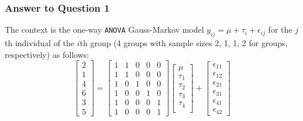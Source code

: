 \documentclass[paper=a4, fontsize=11pt]{scrartcl} %
\begin{document}
\subsubsection*{Answer to Question 1}
The context is the one-way \texttt{ANOVA} Gauss-Markov model  $y_{ij} = \mu + \tau_i + \epsilon_{ij}$ 
for the $j$th  individual of the $i$th group  (4 groups with sample sizes  2, 1, 1, 2 for groups, respectively)
as follows:
$$
\begin{bmatrix} 
2\\ 1\\ 4 \\ 6 \\ 3\\ 5  
\end{bmatrix}
=
\begin{bmatrix} 1 & 1 & 0 & 0 & 0 \\
                             1 & 1 & 0 & 0 & 0 \\
                             1 & 0 & 1 & 0 & 0\\
                             1 & 0 & 0 & 1 & 0 \\
                             1 & 0 & 0 & 0 & 1\\
                             1 & 0 & 0 & 0 & 1
\end{bmatrix}
\begin{bmatrix} 
\mu \\ \tau_1\\ \tau_2 \\ \tau_3 \\ \tau_4 \\ 
\end{bmatrix}
+ 
\begin{bmatrix} 
\epsilon_{1 1 } \\ \epsilon_{1 2}\\ \epsilon_{2 1} \\ \epsilon_{3 1} \\ \epsilon_{4 1} \\\epsilon_{42}  
\end{bmatrix}
$$
\end{document}
